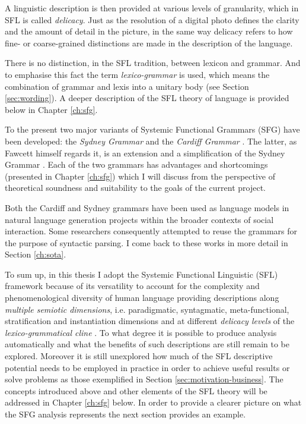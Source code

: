     A linguistic description is then provided at various levels of granularity, which in SFL is called \textit{delicacy}. Just as the resolution of a digital photo defines the clarity and the amount of detail in the picture, in the same way delicacy refers to how fine- or coarse-grained distinctions are made in the description of the language. 
    
    There is no distinction, in the SFL tradition, between lexicon and grammar. And to emphasise this fact the term \textit{lexico-grammar} is used, which means the combination of grammar and lexis into a unitary body (see Section \ref{sec:wording}). %
    A deeper description of the SFL theory of language is provided below in Chapter \ref{ch:sfg}.
    
    To the present two major variants of Systemic Functional Grammars (SFG) have been developed: the \textit{Sydney Grammar} \citep{Halliday2013} and the \textit{Cardiff Grammar} \citep{Fawcett2008}. The latter, as Fawcett himself regards it, is an extension and a simplification of the Sydney Grammar \citep[xviii]{Fawcett2008}. Each of the two grammars has advantages and shortcomings (presented in Chapter \ref{ch:sfg}) which I will discuss from the perspective of theoretical soundness and suitability to the goals of the current project.
    
    Both the Cardiff and Sydney grammars have been used as language models in natural language generation projects within the broader contexts of social interaction. Some researchers \citep{Kasper1988, ODonoghue1991a, ODonnell1993, Souter1996, Day2007} consequently attempted to reuse the grammars for the purpose of syntactic parsing.
    I come back to these works in more detail in Section \ref{ch:sota}.
    
    
    To sum up, in this thesis I adopt the Systemic Functional Linguistic (SFL) framework because of its versatility to account for the complexity and phenomenological diversity of human language providing descriptions along \textit{multiple semiotic dimensions}, i.e. paradigmatic, syntagmatic, meta-functional, stratification and instantiation dimensions \citep{Halliday2003} and at different \textit{delicacy levels} of the \textit{lexico-grammatical cline} \citep{Halliday2002, Hasan2014}. To what degree it is possible to produce analysis automatically and what the benefits of such descriptions are still remain to be explored. Moreover it is still unexplored how much of the SFL descriptive potential needs to be employed in practice in order to achieve useful results or solve problems as those exemplified in Section \ref{sec:motivation-business}. The concepts introduced above and other elements of the SFL theory will be addressed in Chapter \ref{ch:sfg} below. In order to provide a clearer picture on what the SFG analysis represents the next section provides an example.
    
